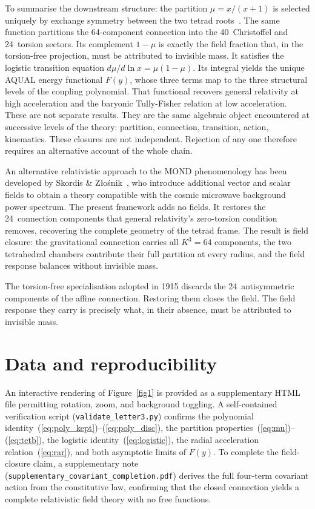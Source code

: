 \documentclass[twocolumn]{iopjournal}
\begin{document}
To summarise the downstream structure: the partition
$\mu = x/(x{+}1)$ is selected uniquely by exchange symmetry
between the two tetrad roots~\cite{Nelson2026b}.  The same
function partitions the 64-component connection into the
40~Christoffel and 24~torsion sectors.  Its complement
$1 - \mu$ is exactly the field fraction that, in the
torsion-free projection, must be attributed to invisible mass.
It satisfies the logistic transition equation
$d\mu/d\!\ln x = \mu(1{-}\mu)$.  Its integral yields the
unique AQUAL energy functional $F(y)$, whose three terms map
to the three structural levels of the coupling polynomial.
That functional recovers general relativity at high
acceleration and the baryonic Tully-Fisher relation at low
acceleration.  These are not separate results.  They are the
same algebraic object encountered at successive levels of the
theory: partition, connection, transition, action, kinematics.
These closures are not independent.  Rejection of any one
therefore requires an alternative account of the whole chain.

An alternative relativistic approach to the MOND phenomenology
has been developed by Skordis \&
Z\l{}o\'{s}nik~\cite{SkordisZlosnik2021}, who introduce
additional vector and scalar fields to obtain a theory
compatible with the cosmic microwave background power spectrum.
The present framework adds no fields.  It restores the
24~connection components that general relativity's zero-torsion
condition removes, recovering the complete geometry of the
tetrad frame.  The result is field closure: the gravitational
connection carries all $K^3 = 64$ components, the two
tetrahedral chambers contribute their full partition at every
radius, and the field response balances without invisible mass.

The torsion-free specialisation adopted in 1915 discards the
24~antisymmetric components of the affine connection.
Restoring them closes the field.  The field response they
carry is precisely what, in their absence, must be attributed
to invisible mass.


\section{Data and reproducibility}

An interactive rendering of Figure~\ref{fig1} is provided as
a supplementary HTML file permitting rotation, zoom, and
background toggling.  A self-contained verification script
(\texttt{validate\_letter3.py}) confirms the polynomial
identity~(\ref{eq:poly_kept})--(\ref{eq:poly_disc}), the partition
properties~(\ref{eq:mu})--(\ref{eq:tetb}), the logistic
identity~(\ref{eq:logistic}), the radial acceleration
relation~(\ref{eq:rar}), and both asymptotic limits of
$F(y)$.  To complete the field-closure claim, a supplementary
note (\texttt{supplementary\_covariant\_completion.pdf})
derives the full four-term covariant action from the
constitutive law, confirming that the closed connection yields
a complete relativistic field theory with no free functions.
\end{document}
